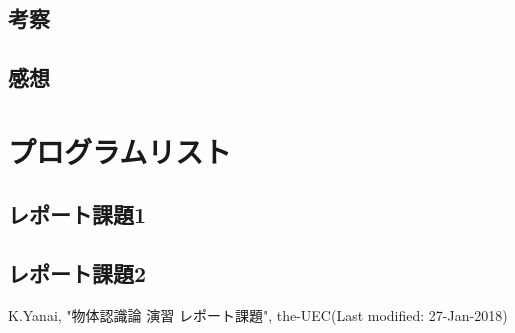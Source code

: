 \documentclass[11pt,a4paper, uplatex]{jsreport}
\begin{document}
\section{考察}
\section{感想}

\appendix
\chapter{プログラムリスト}
\section{レポート課題1}
\section{レポート課題2}
\begin{thebibliography}{数字}
   K.Yanai, "物体認識論 演習 レポート課題", the-UEC(Last modified: 27-Jan-2018)
\end{thebibliography}
\end{document}
